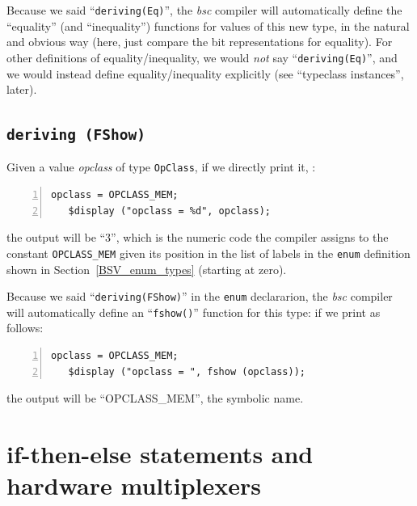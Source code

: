 Because we said ``\verb|deriving(Eq)|'', the \emph{bsc} compiler will
automatically define the ``equality'' (and ``inequality'') functions
for values of this new type, in the natural and obvious way (here,
just compare the bit representations for equality).  For other
definitions of equality/inequality, we would \emph{not} say
``\verb|deriving(Eq)|'', and we would instead define
equality/inequality explicitly (see ``typeclass instances'', later).


\subsection{{\tt deriving (FShow)}}


Given a value \emph{opclass} of type \verb|OpClass|, if we directly
print it, {\eg}:

{\footnotesize
\begin{Verbatim}[frame=single, numbers=left]
   opclass = OPCLASS_MEM;
   $display ("opclass = %d", opclass);
\end{Verbatim}
}

the output will be ``3'', which is the numeric code the compiler
assigns to the constant \verb|OPCLASS_MEM| given its position in the
list of labels in the \verb|enum| definition shown in
Section~\ref{BSV_enum_types} (starting at zero).

Because we said ``\verb|deriving(FShow)|'' in the \verb|enum|
declararion, the \emph{bsc} compiler will automatically define an
``\verb|fshow()|'' function for this type: if we print as follows:

{\footnotesize
\begin{Verbatim}[frame=single, numbers=left]
   opclass = OPCLASS_MEM;
   $display ("opclass = ", fshow (opclass));
\end{Verbatim}
}

the output will be ``OPCLASS\_MEM'', {\ie} the symbolic name.


\section{if-then-else statements and hardware multiplexers}

\label{BSV_Combo_Circuits_if_then_else}

